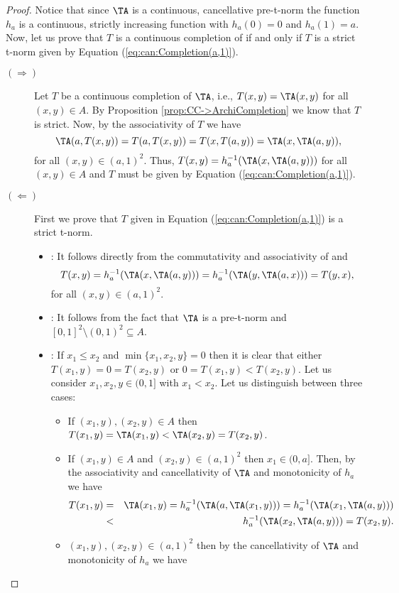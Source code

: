 \begin{proof} Notice that since $\TA$ is a continuous, cancellative pre-t-norm the function $h_a$ is a continuous, strictly increasing function with $h_a(0)=0$ and $h_a(1)=a$. Now, let us prove that $T$ is a continuous completion of \TA if and only if $T$ is a strict t-norm given by Equation (\ref{eq:can:Completion(a,1)}).
	\begin{description}
		\item[$(\Rightarrow)$] Let $T$ be a continuous completion of $\TA$, i.e., $T(x,y)=\TA(x,y)$ for all $(x,y) \in A$. By Proposition \ref{prop:CC->ArchiCompletion} we know that $T$ is strict. Now, by the associativity of $T$ we have
		$$\TA(a,T(x,y))=T(a,T(x,y))=T(x,T(a,y))=\TA(x,\TA(a,y)),$$
		for all $(x,y) \in (a,1)^2$. Thus, $T(x,y)= h_a^{-1}(\TA(x,\TA(a,y)))$ for all $(x,y) \in A$ and $T$ must be given by Equation (\ref{eq:can:Completion(a,1)}).
		\item[$(\Leftarrow)$] First we prove that $T$ given in Equation (\ref{eq:can:Completion(a,1)}) is a strict t-norm.
		\begin{itemize}
			\item \underline{}: It follows directly from the commutativity and associativity of \TA and
			$$T(x,y)=h_a^{-1}(\TA(x,\TA(a,y)))=h_a^{-1}(\TA(y,\TA(a,x)))=T(y,x),$$
			for all $(x,y) \in (a,1)^2$.
			\item \underline{}: It follows from the fact that $\TA$ is a pre-t-norm and $[0,1]^2 \setminus (0,1)^2 \subseteq A$.
			\item \underline{}: If $x_1 \leq x_2$ and $\min\{x_1,x_2,y\}=0$ then it is clear that either $T(x_1,y)=0=T(x_2,y)$ or $0=T(x_1,y)<T(x_2,y)$. Let us consider $x_1,x_2,y \in (0,1]$ with $x_1 < x_2$. Let us distinguish between three cases:
			\begin{itemize}
				\item If $(x_1,y),(x_2,y) \in A$ then $T(x_1,y) = \TA(x_1,y) < \TA(x_2,y)=T(x_2,y)$.
				\item If $(x_1,y) \in A$ and $(x_2,y) \in (a,1)^2$ then $x_1 \in (0,a]$. Then, by the associativity and cancellativity of $\TA$ and monotonicity of $h_a$ we have
				\begin{eqnarray*}
				T(x_1,y) & = &\TA(x_1,y) = h_a^{-1}(\TA(a,\TA(x_1,y))) = h_a^{-1}(\TA(x_1,\TA(a,y))) \\
				 & < & h_a^{-1}(\TA(x_2,\TA(a,y))) = T(x_2,y).
				\end{eqnarray*}
				\item $(x_1,y),(x_2,y) \in (a,1)^2$ then by the cancellativity of $\TA$ and monotonicity of $h_a$ we have

\end{itemize}
\end{itemize}
\end{description}
\end{proof}
